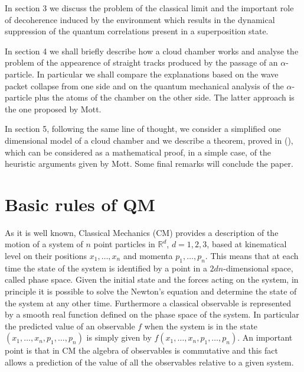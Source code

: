 \documentclass[12pt,reqno]{amsart}
\newcommand{\erre}{\mathbb{R}}
\newcommand{\n}{\relax}
\newcommand{\vs}{\vspace{0.5cm}}
\numberwithin{equation}{section}
\begin{document}
\n
In section 3 we  discuss the problem of the classical limit and the important role of decoherence induced by the environment which results in the dynamical suppression of the quantum correlations present in a  superposition state.

\n
In section 4 we shall briefly describe how a cloud chamber works and analyse the problem of the appearence of  straight tracks produced by the passage of an $\alpha$-particle. In particular we shall compare the explanations based on the wave packet collapse from one side and on the quantum mechanical analysis of the $\alpha$-particle plus the atoms of the chamber on the other side. The latter approach is the one proposed by Mott.

\n
In section 5, following the same line of thought, we consider a simplified one dimensional model of a  cloud chamber  and  we describe  a theorem, proved in (\cite{dft}), which can be considered as a mathematical proof, in a simple case, of the heuristic arguments given by Mott. Some final remarks will conclude the paper.


\vs
\section{Basic rules of QM}

\vs
\n
As it is well known, Classical Mechanics (CM) provides a description of the motion of a system of $n$ point particles in $\erre^d$, $d=1,2,3$,   based  at kinematical level  on their positions $x_1, \ldots , x_n$ and momenta $p_1,\ldots,p_n$. 
This means that at each time the state of the system is identified by a point in a $2 d n$-dimensional space, called  phase space.
 Given the initial state and the forces acting on the system, in principle it is possible to solve the Newton's equation and determine the state  of the system  at any other time. Furthermore 
a classical observable is represented by a smooth real function defined on the phase space of the system.   In particular the predicted value of an  observable $f$ when the system is in the state $(x_1, \ldots , x_n,p_1,\ldots,p_n)$ is simply given by $f(x_1, \ldots , x_n,p_1,\ldots,p_n)$. An important point is that in CM the algebra of observables is commutative and this fact  allows a prediction  of the value of all the observables relative to a given system.
\end{document}
